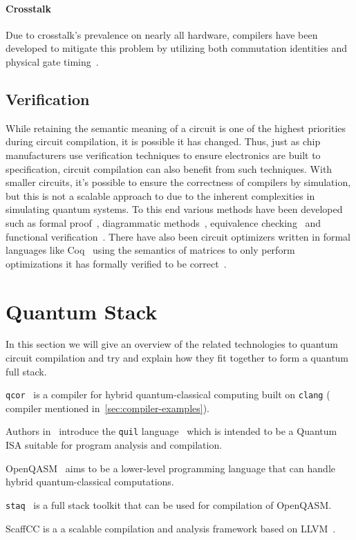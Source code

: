 \paragraph{Crosstalk}
Due to crosstalk's prevalence on nearly all hardware, compilers have been developed to mitigate this problem by utilizing both commutation identities and physical gate timing~\cite{crosstalk-commute,crosstalk-mitigation}. %

\subsection{Verification}

While retaining the semantic meaning of a circuit is one of the highest priorities during circuit compilation, it is possible it has changed.
Thus, just as chip manufacturers use verification techniques to ensure electronics are built to specification, circuit compilation can also benefit from such techniques.
With smaller circuits, it's possible to ensure the correctness of compilers by simulation, but this is not a scalable approach to due to the inherent complexities in simulating quantum systems.
To this end various methods have been developed such as formal proof~\cite{circuit-verification-formal-proof}, diagrammatic methods~\cite{circuit-verification-diagrammatic}, equivalence checking~\cite{circuit-verification-equivalence-check} and functional verification~\cite{circuit-verification-functional}.
There have also been circuit optimizers written in formal languages like Coq~\cite{coq} using the semantics of matrices to only perform optimizations it has formally verified to be correct~\cite{verified-optimizer}.


\section{Quantum Stack}

In this section we will give an overview of the related technologies to quantum circuit compilation and try and explain how they fit together to form a quantum full stack.

\texttt{qcor}~\cite{qcor} is a \CPP{} compiler for hybrid quantum-classical computing built on \texttt{clang} (\CPP{} compiler mentioned in~\cref{sec:compiler-examples}).

Authors in~\cite{qisa} introduce the \texttt{quil} language~\cite{quil} which is intended to be a Quantum \ac{ISA} suitable for program analysis and compilation.

OpenQASM~\cite{openqasm2,openqasm3} aims to be a lower-level programming language that can handle hybrid quantum-classical computations.

\texttt{staq}~\cite{staq} is a full stack toolkit that can be used for compilation of OpenQASM.

ScaffCC is a a scalable compilation and analysis framework based on LLVM~\cite{scaffcc,scaffcc2}.
